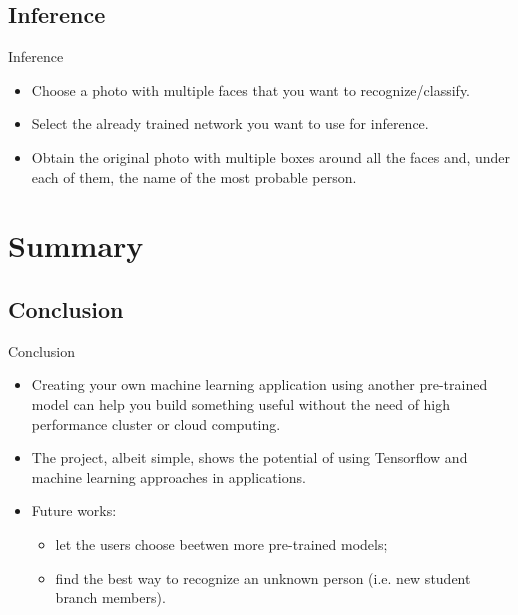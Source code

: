 \documentclass{beamer}
\begin{document}
\subsection{Inference}
\begin{frame}{Inference}
\begin{itemize}
		\setlength\itemsep{1em}
		[triangle]
		
			\item 
				Choose a photo with multiple faces that you want to recognize/classify.
			\item 
				Select the already trained network you want to use for inference.
			\item
				Obtain the original photo with multiple boxes around all the faces and, under each of them, the name of the most probable person.
		
	\end{itemize}
\end{frame}




\section{Summary}

\subsection{Conclusion}
\begin{frame}{Conclusion}
	\begin{itemize}
	\setlength\itemsep{1em}
	[triangle]
	\item 
		Creating your own machine learning application using another pre-trained model can help you build 					something useful without the need of high performance cluster or cloud computing.
	\item 
		The project, albeit simple, shows the potential of using Tensorflow and machine learning approaches in applications.
	\item
		Future works:
	\begin{itemize}
				[circle]
    				\item
      					let the users choose beetwen more pre-trained models;
    				\item    
      					find the best way to recognize an unknown person (i.e. new student branch members).
 
			\end{itemize}
		
	\end{itemize}
\end{frame}
\end{document}
